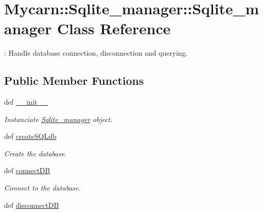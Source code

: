 \hypertarget{classMycarn_1_1Sqlite__manager_1_1Sqlite__manager}{
\section{\-Mycarn\-:\-:\-Sqlite\-\_\-manager\-:\-:\-Sqlite\-\_\-manager \-Class \-Reference}
\label{classMycarn_1_1Sqlite__manager_1_1Sqlite__manager}
}


\-: \-Handle database connection, disconnection and querying.  


\subsection*{\-Public \-Member \-Functions}
\begin{DoxyCompactItemize}
\item 
def \hyperlink{classMycarn_1_1Sqlite__manager_1_1Sqlite__manager_a4aa34aa7fd85b431e4eded995a4aefb8}{\-\_\-\-\_\-init\-\_\-\-\_\-}
\begin{DoxyCompactList}\small\item\em \-Instanciate \hyperlink{classMycarn_1_1Sqlite__manager_1_1Sqlite__manager}{\-Sqlite\-\_\-manager} object. \end{DoxyCompactList}\item 
\hypertarget{classMycarn_1_1Sqlite__manager_1_1Sqlite__manager_ab9aba4220985be37b185da66b180fc7a}{
def \hyperlink{classMycarn_1_1Sqlite__manager_1_1Sqlite__manager_ab9aba4220985be37b185da66b180fc7a}{create\-S\-Q\-Ldb}}
\label{classMycarn_1_1Sqlite__manager_1_1Sqlite__manager_ab9aba4220985be37b185da66b180fc7a}

\begin{DoxyCompactList}\small\item\em \-Create the database. \end{DoxyCompactList}\item 
\hypertarget{classMycarn_1_1Sqlite__manager_1_1Sqlite__manager_a1b9cd592a1b35ed094db7bb012ae7313}{
def \hyperlink{classMycarn_1_1Sqlite__manager_1_1Sqlite__manager_a1b9cd592a1b35ed094db7bb012ae7313}{connect\-D\-B}}
\label{classMycarn_1_1Sqlite__manager_1_1Sqlite__manager_a1b9cd592a1b35ed094db7bb012ae7313}

\begin{DoxyCompactList}\small\item\em \-Connect to the database. \end{DoxyCompactList}\item 
\hypertarget{classMycarn_1_1Sqlite__manager_1_1Sqlite__manager_aa9f02199406633c86e55fd92f88229ca}{
def \hyperlink{classMycarn_1_1Sqlite__manager_1_1Sqlite__manager_aa9f02199406633c86e55fd92f88229ca}{disconnect\-D\-B}}
\label{classMycarn_1_1Sqlite__manager_1_1Sqlite__manager_aa9f02199406633c86e55fd92f88229ca}


\end{DoxyCompactItemize}

